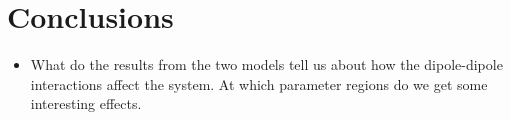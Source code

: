 \documentclass[pra,superscriptaddress,twocolumn,notitlepage,showpacs]{revtex4-1}
\begin{document}
\section*{Conclusions}
\begin{itemize}
\item What do the results from the two models tell us about how the dipole-dipole
interactions affect the system. At which parameter regions do we get
some interesting effects.\end{itemize}

%


\begin{thebibliography}{31}
\end{thebibliography}
\end{document}
